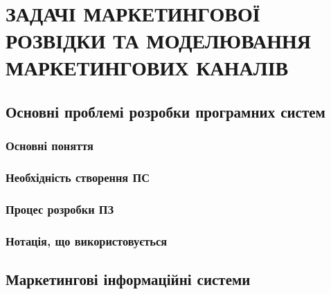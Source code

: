 ﻿\section{ЗАДАЧІ МАРКЕТИНГОВОЇ РОЗВІДКИ ТА МОДЕЛЮВАННЯ МАРКЕТИНГОВИХ КАНАЛІВ}
%
\subsection{Основні проблемі розробки програмних систем}
\subsubsection{Основні поняття}
\subsubsection{Необхідність створення ПС}
\subsubsection{Процес розробки ПЗ}
\subsubsection{Нотація, що використовується}

\subsection{Маркетингові інформаційні системи}


